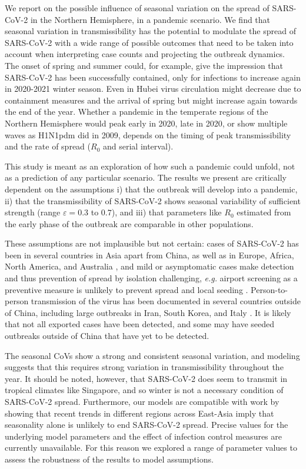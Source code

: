 \documentclass[rmp, reprint, superscriptaddress, floatfix,amsmath]{revtex4-1}
\newcommand{\forcing}{\varepsilon}
\begin{document}
We report on the possible influence of seasonal variation on the spread of SARS-CoV-2 in the Northern Hemisphere, in a pandemic scenario. We find that seasonal variation in transmissibility has the potential to modulate the spread of SARS-CoV-2 with a wide range of possible outcomes that need to be taken into account when interpreting case counts and projecting the outbreak dynamics. 
The onset of spring and summer could, for example, give the impression that SARS-CoV-2 has been successfully contained, only for infections to increase again in 2020-2021 winter season. 
Even in Hubei virus circulation might decrease due to containment measures and the arrival of spring but might increase again towards the end of the year.
Whether a pandemic in the temperate regions of the Northern Hemisphere would peak early in 2020, late in 2020, or show multiple waves as H1N1pdm did in 2009, depends on the timing of peak transmissibility and the rate of spread ($R_0$ and serial interval).

This study is meant as an exploration of how such a pandemic could unfold, not as a prediction of any particular scenario.
The results we present are critically dependent on the assumptions
i) that the outbreak will develop into a pandemic,
ii) that the transmissibility of SARS-CoV-2 shows seasonal variability of sufficient strength (range $\forcing=0.3$ to $0.7$), and  
iii) that parameters like $R_0$ estimated from the early phase of the outbreak are comparable in other populations. 

These assumptions are not implausible but not certain: cases of SARS-CoV-2 has been in several countries in Asia apart from China, as well as in Europe, Africa, North America, and Australia \citep{WHO_situation_report37}, and mild or asymptomatic cases make detection and thus prevention of spread by isolation challenging, \textit{e.g.} airport screening as a preventive measure is unlikely to prevent spread and local seeding \citep{quilty2020effectiveness}. 
Person-to-person transmission of the virus has been documented in several countries outside of China, including large outbreaks in Iran, South Korea, and Italy \citep{ECDC_23feb}. 
It is likely that not all exported cases have been detected, and some may have seeded outbreaks outside of China that have yet to be detected. 

The seasonal CoVs show a strong and consistent seasonal variation, and modeling suggests that this requires strong variation in transmissibility throughout the year.
It should be noted, however, that SARS-CoV-2 does seem to transmit in tropical climates like Singapore, and so winter is not a necessary condition of SARS-CoV-2 spread. 
Furthermore, our models are compatible with work by \citet{luo_role_2020} showing that recent trends in different regions across East-Asia imply that seasonality alone is unlikely to end SARS-CoV-2 spread.
Precise values for the underlying model parameters and the effect of infection control measures are currently unavailable. For this reason we explored a range of parameter values to assess the robustness of the results to model assumptions.
\end{document}
